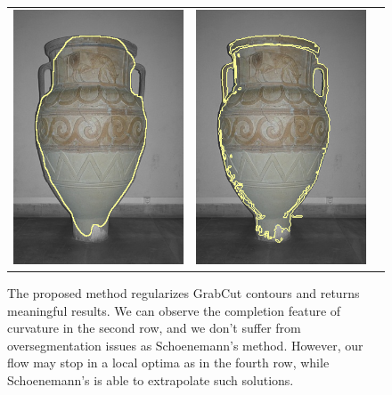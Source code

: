 \documentclass[smallextended]{svjour3}       %
\begin{document}
{{\begin{figure}[ht!]
\begin{tabular}{ccc}
		\includegraphics[scale=0.2]{images/segmentation/bc/vase/corrected-seg.png} &					\includegraphics[scale=0.2]{images/segmentation/schoenemann/vase/vase-seg.png}		
	\end{tabular}
	\caption{The proposed method regularizes GrabCut contours and returns meaningful results. We can observe the completion feature of curvature in the second row, and we don't suffer from oversegmentation issues as Schoenemann's method. However, our flow may stop in a local optima as in the fourth row, while Schoenemann's is able to extrapolate such solutions.}
	\label{fig:segmentation-results}	
\end{figure}


}}
\end{document}
